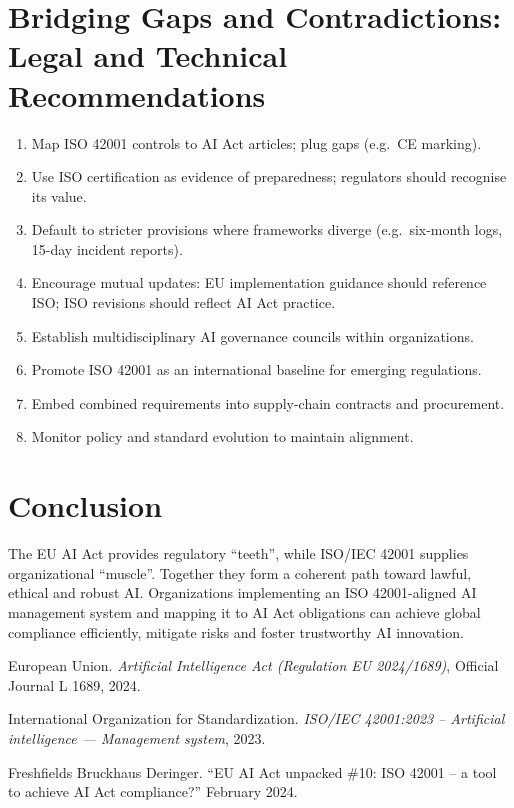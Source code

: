\documentclass{article}
\begin{document}
\section{Bridging Gaps and Contradictions: Legal and Technical Recommendations}
\begin{enumerate}
  \item Map ISO 42001 controls to AI Act articles; plug gaps (e.g.\ CE marking).
  \item Use ISO certification as evidence of preparedness; regulators should recognise its value.
  \item Default to stricter provisions where frameworks diverge (e.g.\ six-month logs, 15-day incident reports).
  \item Encourage mutual updates: EU implementation guidance should reference ISO; ISO revisions should reflect AI Act practice.
  \item Establish multidisciplinary AI governance councils within organizations.
  \item Promote ISO 42001 as an international baseline for emerging regulations.
  \item Embed combined requirements into supply-chain contracts and procurement.
  \item Monitor policy and standard evolution to maintain alignment.
\end{enumerate}

\section{Conclusion}
The EU AI Act provides regulatory “teeth”, while ISO/IEC 42001 supplies organizational “muscle”. Together they form a coherent path toward lawful, ethical and robust AI. Organizations implementing an ISO 42001-aligned AI management system and mapping it to AI Act obligations can achieve global compliance efficiently, mitigate risks and foster trustworthy AI innovation.



\begin{thebibliography}{9}
European Union.
\newblock \emph{Artificial Intelligence Act (Regulation EU 2024/1689)}, Official Journal L 1689, 2024.

International Organization for Standardization.
\newblock \emph{ISO/IEC 42001:2023 – Artificial intelligence — Management system}, 2023.

Freshfields Bruckhaus Deringer.
\newblock ``EU AI Act unpacked \#10: ISO 42001 – a tool to achieve AI Act compliance?'' February 2024.

\end{thebibliography}
\end{document}
